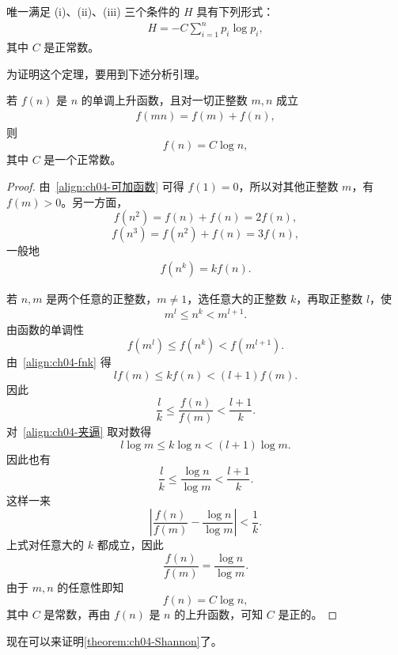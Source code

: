 \documentclass[../../main.tex]{subfiles}
\begin{document}
\begin{theorem}[Shannon]\label{theorem:ch04-Shannon}
唯一满足 (i)、(ii)、(iii) 三个条件的 $H$ 具有下列形式：
\begin{align}
H=-C\sum_{i=1}^n p_i\log p_i,\label{align:ch04-熵定义}
\end{align}
其中 $C$ 是正常数。
\end{theorem}

为证明这个定理，要用到下述分析引理。

\begin{lemma}[可加单调函数]\label{lemma:ch04-可加单调函数}
若 $f(n)$ 是 $n$ 的单调上升函数，且对一切正整数 $m,n$ 成立
\begin{align}
f(mn)=f(m)+f(n),\label{align:ch04-可加函数}
\end{align}
则
\[
f(n)=C\log n,
\]
其中 $C$ 是一个正常数。
\end{lemma}

\begin{proof}
由~\eqref{align:ch04-可加函数} 可得 $f(1)=0$，所以对其他正整数 $m$，有 $f(m)>0$。另一方面，
\[
f(n^2)=f(n)+f(n)=2f(n),
\]
\[
f(n^3)=f(n^2)+f(n)=3f(n),
\]
一般地
\begin{align}
f(n^k)=kf(n).\label{align:ch04-fnk}
\end{align}

若 $n,m$ 是两个任意的正整数，$m\neq 1$，选任意大的正整数 $k$，再取正整数 $l$，使
\begin{align}
m^l\leqslant n^k<m^{l+1}.\label{align:ch04-夹逼}
\end{align}
由函数的单调性
\[
f(m^l)\leqslant f(n^k)<f(m^{l+1}).
\]
由~\eqref{align:ch04-fnk} 得
\[
lf(m)\leqslant kf(n)<(l+1)f(m).
\]
因此
\[
\frac{l}{k}\leqslant\frac{f(n)}{f(m)}<\frac{l+1}{k}.
\]
对~\eqref{align:ch04-夹逼} 取对数得
\[
l\log m\leqslant k\log n<(l+1)\log m.
\]
因此也有
\[
\frac{l}{k}\leqslant\frac{\log n}{\log m}<\frac{l+1}{k}.
\]
这样一来
\[
\left|\frac{f(n)}{f(m)}-\frac{\log n}{\log m}\right|<\frac{1}{k}.
\]
上式对任意大的 $k$ 都成立，因此
\[
\frac{f(n)}{f(m)}=\frac{\log n}{\log m}.
\]
由于 $m,n$ 的任意性即知
\[
f(n)=C\log n,
\]
其中 $C$ 是常数，再由 $f(n)$ 是 $n$ 的上升函数，可知 $C$ 是正的。
\end{proof}

现在可以来证明\cref{theorem:ch04-Shannon}了。
\end{document}
